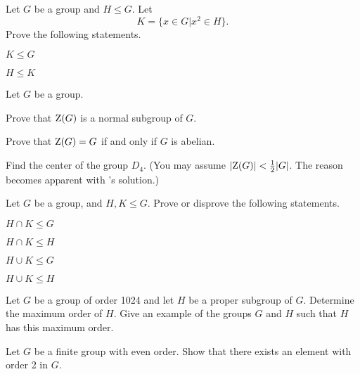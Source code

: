 \begin{problem}
    Let $G$ be a group and $H \leq G$. Let
    \[
        K = \{x \in G \vert x^2 \in H\}.
    \]
    Prove the following statements.
    \begin{partquestions}{\alph*}
        \item $K \leq G$
        \item $H \leq K$
    \end{partquestions}
\end{problem}

\begin{problem}\label{problem-center-of-G}
    Let $G$ be a group.
    \begin{partquestions}{\alph*}
        \item Prove that $\mathrm{Z}(G)$ is a normal subgroup of $G$.
        \item Prove that $\mathrm{Z}(G) = G$ if and only if $G$ is abelian.
        \item Find the center of the group $D_4$.\newline
        (You may assume $|\mathrm{Z}(G)| < \frac12 |G|$. The reason becomes apparent with 's solution.)
    \end{partquestions}
\end{problem}

\begin{problem}\label{problem-intersection-of-subgroups}
    Let $G$ be a group, and $H, K \leq G$. Prove or disprove the following statements.
    \begin{partquestions}{\alph*}
        \item $H \cap K \leq G$
        \item $H \cap K \leq H$
        \item $H \cup K \leq G$
        \item $H \cup K \leq H$
    \end{partquestions}
\end{problem}

\begin{problem}
    Let $G$ be a group of order 1024 and let $H$ be a proper subgroup of $G$. Determine the maximum order of $H$. Give an example of the groups $G$ and $H$ such that $H$ has this maximum order.
\end{problem}

\begin{problem}
    Let $G$ be a finite group with even order. Show that there exists an element with order 2 in $G$.
\end{problem}

